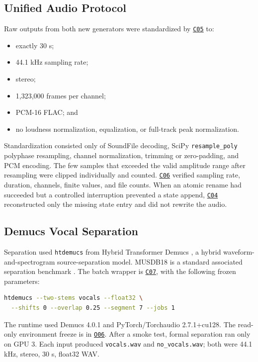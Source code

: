 \documentclass[11pt,a4paper]{article}
\newcommand{\coderef}[1]{\hyperlink{code:#1}{\texttt{#1}}}
\newcommand{\outref}[1]{\hyperlink{output:#1}{\texttt{#1}}}
\begin{document}
\subsection{Unified Audio Protocol}

Raw outputs from both new generators were standardized by \coderef{C05} to:

\begin{itemize}
  \item exactly 30 s;
  \item 44.1 kHz sampling rate;
  \item stereo;
  \item 1,323,000 frames per channel;
  \item PCM-16 FLAC; and
  \item no loudness normalization, equalization, or full-track peak normalization.
\end{itemize}

Standardization consisted only of SoundFile decoding, SciPy \texttt{resample\_poly} polyphase resampling, channel normalization, trimming or zero-padding, and PCM encoding. The few samples that exceeded the valid amplitude range after resampling were clipped individually and counted. \coderef{C06} verified sampling rate, duration, channels, finite values, and file counts. When an atomic rename had succeeded but a controlled interruption prevented a state append, \coderef{C04} reconstructed only the missing state entry and did not rewrite the audio.

\subsection{Demucs Vocal Separation}

Separation used \texttt{htdemucs} from Hybrid Transformer Demucs \citep{demucs2021}, a hybrid waveform-and-spectrogram source-separation model. MUSDB18 is a standard associated separation benchmark \citep{musdb18}. The batch wrapper is \coderef{C07}, with the following frozen parameters:

\begin{lstlisting}[language=bash,caption={Frozen Demucs vocal-only parameters.}]
htdemucs --two-stems vocals --float32 \
  --shifts 0 --overlap 0.25 --segment 7 --jobs 1
\end{lstlisting}

The runtime used Demucs 4.0.1 and PyTorch/Torchaudio 2.7.1+cu128. The read-only environment freeze is in \outref{O06}. After a smoke test, formal separation ran only on GPU 3. Each input produced \texttt{vocals.wav} and \texttt{no\_vocals.wav}; both were 44.1 kHz, stereo, 30 s, float32 WAV.
\end{document}

